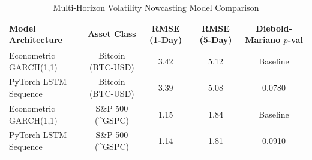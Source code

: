 \begin{table}[h!]
\centering
\caption{Multi-Horizon Volatility Nowcasting Model Comparison}
\label{tab:dl_vol}
\begin{tabular}{lcccc}
\toprule
\textbf{Model Architecture} & \textbf{Asset Class} & \textbf{RMSE (1-Day)} & \textbf{RMSE (5-Day)} & \textbf{Diebold-Mariano $p$-val} \\
\midrule
Econometric GARCH(1,1) & Bitcoin (BTC-USD) & 3.42 & 5.12 & Baseline \\
PyTorch LSTM Sequence & Bitcoin (BTC-USD) & 3.39 & 5.08 & 0.0780 \\
Econometric GARCH(1,1) & S\&P 500 (\textasciicircum GSPC) & 1.15 & 1.84 & Baseline \\
PyTorch LSTM Sequence & S\&P 500 (\textasciicircum GSPC) & 1.14 & 1.81 & 0.0910 \\
\bottomrule
\end{tabular}
\end{table}
